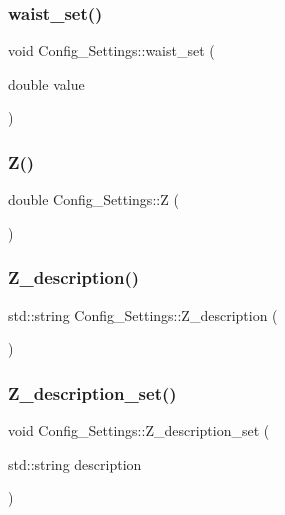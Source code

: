 \subsubsection{\texorpdfstring{waist\+\_\+set()}{waist\_set()}}
{\footnotesize\ttfamily void Config\+\_\+\+Settings\+::waist\+\_\+set (\begin{DoxyParamCaption}\item[{double}]{value }\end{DoxyParamCaption})}

\mbox{\label{class_config___settings_a1c01d83346316e0467ccbb0051e7461d}} 
\subsubsection{\texorpdfstring{Z()}{Z()}}
{\footnotesize\ttfamily double Config\+\_\+\+Settings\+::Z (\begin{DoxyParamCaption}{ }\end{DoxyParamCaption})}

\mbox{\label{class_config___settings_afcb63f53c1a6a4e4d6240a10be72970c}} 
\subsubsection{\texorpdfstring{Z\+\_\+description()}{Z\_description()}}
{\footnotesize\ttfamily std\+::string Config\+\_\+\+Settings\+::\+Z\+\_\+description (\begin{DoxyParamCaption}{ }\end{DoxyParamCaption})}

\mbox{\label{class_config___settings_a8e956243cd53b6bb7bf5c0cf66029e3c}} 
\subsubsection{\texorpdfstring{Z\+\_\+description\+\_\+set()}{Z\_description\_set()}}
{\footnotesize\ttfamily void Config\+\_\+\+Settings\+::\+Z\+\_\+description\+\_\+set (\begin{DoxyParamCaption}\item[{std\+::string}]{description }\end{DoxyParamCaption})}

